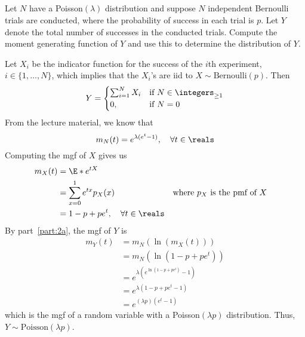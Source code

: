 \documentclass[%
  hwnumber=7,%
  studentnumber=20053722,%
  {name=Bryan Hoang}%
]{%
  mthe353answer%
}
\begin{document}
\begin{questions}
\begin{parts}
      \part{}
      Let \(N\) have a Poisson\((\lambda)\) distribution and suppose \(N\) independent
      Bernoulli trials are conducted, where the probability of success in each
      trial is \(p\). Let \(Y\) denote the total number of successes in the
      conducted trials. Compute the moment generating function of \(Y\) and use
      this to determine the distribution of \(Y\).
      \begin{solution}
        Let \(X_i\) be the indicator function for the success of the \(i\)th experiment,
        \(i \in \{1, \dotsc, N\}\), which implies that the \(X_i\)'s are iid to
        \(X \sim \text{Bernoulli}(p)\). Then
        \begin{equation*}
          Y = \begin{cases}
            \sum_{i=1}^N X_i & \text{if}\ N \in \integers_{\ge 1}\\
            0, & \text{if}\ N = 0
          \end{cases}
        \end{equation*}
        From the lecture material, we know that
        \begin{equation*}
          m_N(t) = e^{\lambda(e^t-1)}, \quad \forall t \in \reals
        \end{equation*}
        Computing the mgf of \(X\) gives us
        \begin{align*}
          m_X(t) &= \E*{e^{tX}}\\
          &= \sum_{x=0}^1 e^{tx} p_X(x) && \text{where \(p_X\) is the pmf of \(X\)}\\
          &= 1 - p + pe^t, \quad \forall t \in \reals
        \end{align*}
        By part~\ref{part:2a}, the mgf of \(Y\) is
        \begin{align*}
          m_Y(t) &= m_N(\ln(m_X(t)))\\
          &= m_N(\ln(1 - p + pe^t))\\
          &= e^{\lambda\left(e^{\ln(1 - p + pe^t)} - 1\right)}\\
          &= e^{\lambda\left(1 - p + pe^t - 1\right)}\\
          &= e^{(\lambda p)(e^t-1)}
        \end{align*}
        which is the mgf of a random variable with a Poisson\((\lambda p)\)
        distribution. Thus, \(\boxed{Y \sim \text{Poisson}(\lambda p)}\).
      \end{solution}
    \end{parts}
  \end{questions}
\end{document}
